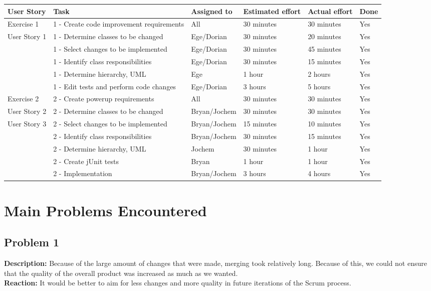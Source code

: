 \documentclass[10pt]{article}
\begin{document}
\begin{center}

    \hspace*{-3cm}\begin{tabular}{ | p{2cm} | p{9cm} | p{2cm} | p{1.8cm} | p{1.8cm} | p{1cm} |}
    \hline
    User Story & Task & Assigned to & Estimated effort & Actual effort & Done \\ \hline
    Exercise 1 & 1 - Create code improvement requirements & All & 30 minutes & 30 minutes & Yes\\ 
    User Story 1 & 1 - Determine classes to be changed & Ege/Dorian & 30 minutes & 20 minutes & Yes\\ 
    & 1 - Select changes to be implemented & Ege/Dorian & 30 minutes & 45 minutes & Yes\\ 
    & 1 - Identify class responsibilities & Ege/Dorian & 30 minutes & 15 minutes & Yes\\ 
    & 1 - Determine hierarchy, UML & Ege & 1 hour & 2 hours & Yes\\ 
    & 1 - Edit tests and perform code changes & Ege/Dorian & 3 hours & 5 hours & Yes\\ \hline
    Exercise 2 & 2 - Create powerup requirements & All & 30 minutes & 30 minutes & Yes \\ 
    User Story 2 & 2 - Determine classes to be changed & Bryan/Jochem & 30 minutes & 30 minutes & Yes\\ 
    User Story 3 & 2 - Select changes to be implemented & Bryan/Jochem & 15 minutes & 10 minutes & Yes \\ 
    & 2 - Identify class responsibilities & Bryan/Jochem & 30 minutes & 15 minutes & Yes\\ 
    & 2 - Determine hierarchy, UML & Jochem & 30 minutes & 1 hour & Yes \\ 
    & 2 - Create jUnit tests & Bryan & 1 hour & 1 hour & Yes \\ 
    & 2 - Implementation & Bryan/Jochem & 3 hours & 4 hours & Yes \\ \hline    
    \end{tabular}
\end{center}

\section*{Main Problems Encountered}
\subsection*{Problem 1}
\textbf{Description:}
Because of the large amount of changes that were made, merging took relatively long. Because of this, we could not ensure that the quality of the overall product was increased as much as we wanted.\\
\textbf{Reaction:} 
It would be better to aim for less changes and more quality in future iterations of the Scrum process.
\end{document}
